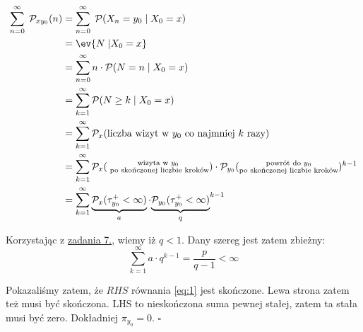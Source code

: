 \[
	\begin{aligned}
		\sum_{n=0}^\infty \; \mathcal{P}_{xy_0}(n) & =
		\sum_{n=0}^\infty \; \mathcal{P}(X_n = y_0 \; | \; X_0 = x)                                                                                                                                      \\
		                                           & = \ev{N \; | X_0 = x}                                                                                                                               \\
		                                           & = \sum_{n = 0}^\infty n \cdot \mathcal{P}(N = n \; | \; X_0 = x)                                                                                    \\
		                                           & = \sum_{k = 1}^\infty \mathcal{P}(N \ge k \; | \; X_0 = x)                                                                                          \\
		                                           & = \sum_{k = 1}^\infty \mathcal{P}_x(\text{liczba wizyt w \(y_0\) co najmniej \(k\) razy})                                                           \\
		                                           & = \sum_{k = 1}^\infty \mathcal{P}_x(\substack{\text{wizyta w } y_0                                                                                  \\ \text{ po skończonej liczbie kroków}}) \cdot \mathcal{P}_{y_0}(\substack{\text{powrót do } y_0 \\ \text{po skończonej liczbie kroków}})^{k-1} \\
		                                           & = \sum_{k = 1}^\infty \underbrace{\mathcal{P}_x(\tau_{y_0}^+ < \infty)}_{a} \cdot {\underbrace{\mathcal{P}_{y_0}(\tau_{y_0}^+ < \infty)}_{q}}^{k-1} \\
	\end{aligned}
\]

Korzystając z \hyperref[set07.task7]{zadania 7.}, wiemy iż \(q < 1\). Dany szereg jest zatem zbieżny:
\[
	\sum_{k=1}^\infty a \cdot q^{k-1} = \frac{p}{q-1} < \infty
\]

Pokazaliśmy zatem, że \(RHS\) równania \eqref{eq:1} jest skończone. Lewa strona zatem też musi być skończona. LHS to nieskończona suma pewnej stałej, zatem ta stała musi być zero. Dokładniej \(\pi_{y_0} = 0\). \hfill \(\square\)
